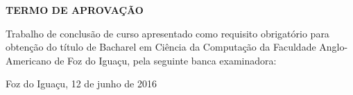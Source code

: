 \begin{folhadeaprovacao}
\begin{center}
	\vspace*{1cm}  
  	\large\textbf{TERMO DE APROVAÇÃO}
  	
  	\vspace*{1cm}
  	{\large\textbf\imprimirautor}

   \vspace*{1cm}
    {\large\textbf\imprimirtitulo}   
 \end{center}     
  
	
	\hspace{.4\textwidth}
	\SingleSpace\noindent\normalsize{Trabalho de conclusão de curso apresentado como requisito obrigatório para obtenção do título de Bacharel em Ciência da Computação da Faculdade Anglo-Americano de Foz do Iguaçu, pela seguinte banca examinadora:}
   
    
   \vspace*{0.5cm}  %
   \vspace*{2.5cm}
   \begin{center}
   	{Foz do Iguaçu, 12 de junho de 2016}
   \end{center}
   
 
\end{folhadeaprovacao}